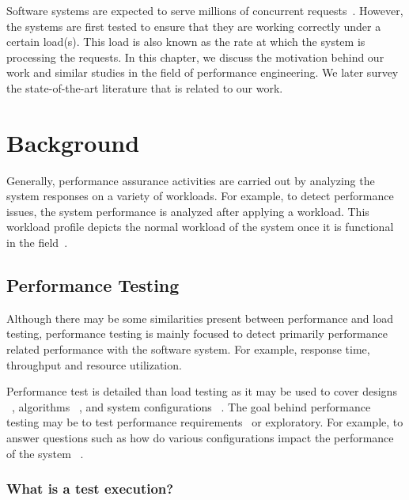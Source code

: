 

Software systems are expected to serve millions of concurrent requests~\cite{arlitt2000workload}. However, the systems are first tested to ensure that they are working correctly under a certain load(s). This load is also known as the rate at which the system is processing the requests. 
In this chapter, we discuss the motivation behind our work and similar studies in the field of performance engineering. We later survey the state-of-the-art literature that is related to our work.

\section{Background}

Generally, performance assurance activities are carried out by analyzing the system responses on a variety of workloads. For example, to detect performance issues, the system performance is analyzed after applying a workload. This workload profile depicts the normal workload of the system once it is functional in the field~\cite{464549}.


\subsection{Performance Testing}

Although there may be some similarities present between performance and load testing, performance testing is mainly focused to detect primarily performance related performance with the software system. For example, response time, throughput and resource utilization.~\cite{Barna:2011,6032540,Gorton}

Performance test is detailed than load testing as it may be used to cover designs ~\cite{csurgay1999performance,denaro2004early,denaro2005performance}, algorithms ~\cite{cangussu2009segment,cangussu2007reducing}, and system configurations ~\cite{hoskins2005software,pozin2011models,sopitkamol2005method}. The goal behind performance testing may be to test performance requirements~\cite{pozin2011models} or exploratory. For example, to answer questions such as how do various configurations impact the performance of the system ~\cite{Menasce:2000,Menasce:1994,Menasce:2001,pozin2011models}.

\subsubsection{What is a test execution?}




